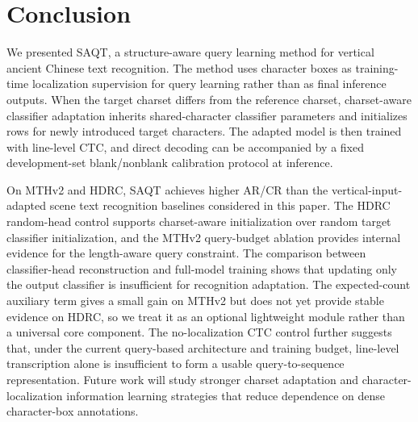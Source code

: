 \section{Conclusion}

We presented SAQT, a structure-aware query learning method for vertical ancient Chinese text recognition. The method uses character boxes as training-time localization supervision for query learning rather than as final inference outputs. When the target charset differs from the reference charset, charset-aware classifier adaptation inherits shared-character classifier parameters and initializes rows for newly introduced target characters. The adapted model is then trained with line-level CTC, and direct decoding can be accompanied by a fixed development-set blank/nonblank calibration protocol at inference.

On MTHv2 and HDRC, SAQT achieves higher AR/CR than the vertical-input-adapted scene text recognition baselines considered in this paper. The HDRC random-head control supports charset-aware initialization over random target classifier initialization, and the MTHv2 query-budget ablation provides internal evidence for the length-aware query constraint. The comparison between classifier-head reconstruction and full-model training shows that updating only the output classifier is insufficient for recognition adaptation. The expected-count auxiliary term gives a small gain on MTHv2 but does not yet provide stable evidence on HDRC, so we treat it as an optional lightweight module rather than a universal core component. The no-localization CTC control further suggests that, under the current query-based architecture and training budget, line-level transcription alone is insufficient to form a usable query-to-sequence representation. Future work will study stronger charset adaptation and character-localization information learning strategies that reduce dependence on dense character-box annotations.
